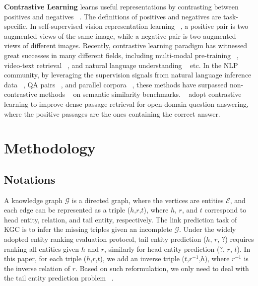 \documentclass[11pt]{article}
\begin{document}
\noindent
\textbf{Contrastive Learning }
learns useful representations by contrasting
between positives and negatives ~\citep{le2020contrastive}.
The definitions of positives and negatives are task-specific.
In self-supervised vision representation learning
~\citep{chen2020simple,he2020momentum,grill2020bootstrap},
a positive pair is two augmented views of the same image,
while a negative pair is two augmented views of different images.
Recently,
contrastive learning paradigm has witnessed great successes
in many different fields,
including multi-modal pre-training ~\citep{radford2021learning},
video-text retrieval ~\citep{Liu2021HiTHT},
and natural language understanding ~\citep{gunel2020supervised} etc.
In the NLP community,
by leveraging the supervision signals from natural language inference data ~\citep{gao2021simcse},
QA pairs ~\citep{ni2021sentence},
and parallel corpora ~\citep{Wang2021AligningCS},
these methods have surpassed non-contrastive methods ~\citep{Reimers2019SentenceBERTSE}
on semantic similarity benchmarks.
~\citet{karpukhin-etal-2020-dense,qu-etal-2021-rocketqa,xiong2020approximate}
adopt contrastive learning to improve dense passage retrieval
for open-domain question answering,
where the positive passages are the ones containing the correct answer.

\section{Methodology}

\subsection{Notations}

A knowledge graph $\mathcal{G}$ is a directed graph,
where the vertices are entities $\mathcal{E}$,
and each edge can be represented as a triple ($h$,$r$,$t$),
where $h$, $r$, and $t$ correspond to
head entity, relation, and tail entity, respectively.
The link prediction task of KGC is to infer the missing triples given an incomplete $\mathcal{G}$.
Under the widely adopted entity ranking evaluation protocol,
tail entity prediction ($h$, $r$, $?$) requires ranking all entities given $h$ and $r$,
similarly for head entity prediction ($?$, $r$, $t$).
In this paper,
for each triple ($h$,$r$,$t$),
we add an inverse triple ($t$,$r^{-1}$,$h$),
where $r^{-1}$ is the inverse relation of $r$.
Based on such reformulation,
we only need to deal with the tail entity prediction problem ~\citep{Malaviya2020CommonsenseKB}.
\end{document}
